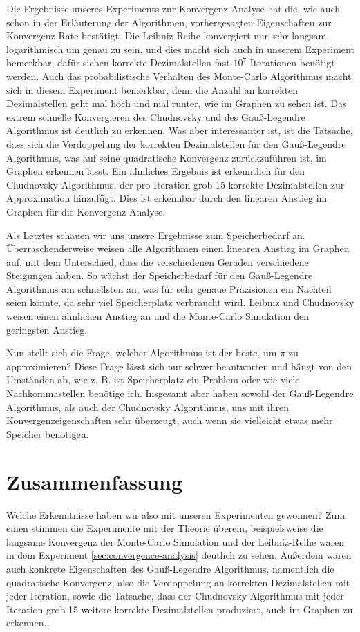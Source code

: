 \documentclass{scrartcl}
\theoremstyle{definition}
\newtheorem{approximation sequence}{Annäherungsfolge}
\begin{document}
Die Ergebnisse unseres Experiments zur Konvergenz Analyse hat die, wie auch
schon in der Erläuterung der Algorithmen, vorhergesagten Eigenschaften zur
Konvergenz Rate bestätigt. Die Leibniz-Reihe konvergiert nur sehr langsam,
logarithmisch um genau zu sein, und dies macht sich auch in unserem Experiment
bemerkbar, dafür sieben korrekte Dezimalstellen fast \(10^7\) Iterationen
benötigt werden. Auch das probabilistische Verhalten des Monte-Carlo
Algorithmus macht sich in diesem Experiment bemerkbar, denn die Anzahl an
korrekten Dezimalstellen geht mal hoch und mal runter, wie im Graphen zu sehen
ist. Das extrem schnelle Konvergieren des Chudnovsky und des Gauß-Legendre
Algorithmus ist deutlich zu erkennen. Was aber interessanter ist, ist die
Tatsache, dass sich die Verdoppelung der korrekten Dezimalstellen für den
Gauß-Legendre Algorithmus, was auf seine quadratische Konvergenz zurückzuführen
ist, im Graphen erkennen lässt. Ein ähnliches Ergebnis ist erkenntlich für den
Chudnovsky Algorithmus, der pro Iteration grob 15 korrekte Dezimalstellen zur
Approximation hinzufügt. Dies ist erkennbar durch den linearen Anstieg im
Graphen für die Konvergenz Analyse.

Als Letztes schauen wir uns unsere Ergebnisse zum Speicherbedarf an.
Überraschenderweise weisen alle Algorithmen einen linearen Anstieg im Graphen
auf, mit dem Unterschied, dass die verschiedenen Geraden verschiedene
Steigungen haben. So wächst der Speicherbedarf für den Gauß-Legendre
Algorithmus am schnellsten an, was für sehr genaue Präzisionen ein Nachteil
seien könnte, da sehr viel Speicherplatz verbraucht wird. Leibniz und
Chudnovsky weisen einen ähnlichen Anstieg an und die Monte-Carlo Simulation den
geringsten Anstieg.

Nun stellt sich die Frage, welcher Algorithmus ist der beste, um \(\pi\) zu
approximieren? Diese Frage lässt sich nur schwer beantworten und hängt von den
Umständen ab, wie z. B. ist Speicherplatz ein Problem oder wie viele
Nachkommastellen benötige ich. Insgesamt aber haben sowohl der Gauß-Legendre
Algorithmus, als auch der Chudnovsky Algorithmus, uns mit ihren
Konvergenzeigenschaften sehr überzeugt, auch wenn sie vielleicht etwas mehr
Speicher benötigen.

\section{Zusammenfassung}

Welche Erkenntnisse haben wir also mit unseren Experimenten gewonnen? Zum einen
stimmen die Experimente mit der Theorie überein, beispielsweise die langsame
Konvergenz der Monte-Carlo Simulation und der Leibniz-Reihe waren in dem
Experiment \autoref{sec:convergence-analysis} deutlich zu sehen. Außerdem waren
auch konkrete Eigenschaften des Gauß-Legendre Algorithmus, namentlich die
quadratische Konvergenz, also die Verdoppelung an korrekten Dezimalstellen mit
jeder Iteration, sowie die Tatsache, dass der Chudnovsky Algorithmus mit jeder
Iteration grob 15 weitere korrekte Dezimalstellen produziert, auch im Graphen
zu erkennen.
\end{document}
